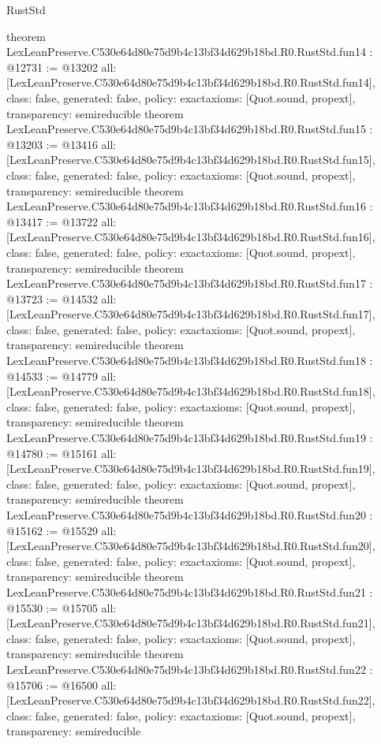 \begin{lexlean}{RustStd}
\begin{coremodule}
{}
theorem LexLeanPreserve.C530e64d80e75d9b4c13bf34d629b18bd.R0.RustStd.fun14 : @12731 := @13202 {
  all: [LexLeanPreserve.C530e64d80e75d9b4c13bf34d629b18bd.R0.RustStd.fun14],
  class: false,
  generated: false,
  policy: exact{axioms: [Quot.sound, propext]},
  transparency: semireducible
}
theorem LexLeanPreserve.C530e64d80e75d9b4c13bf34d629b18bd.R0.RustStd.fun15 : @13203 := @13416 {
  all: [LexLeanPreserve.C530e64d80e75d9b4c13bf34d629b18bd.R0.RustStd.fun15],
  class: false,
  generated: false,
  policy: exact{axioms: [Quot.sound, propext]},
  transparency: semireducible
}
theorem LexLeanPreserve.C530e64d80e75d9b4c13bf34d629b18bd.R0.RustStd.fun16 : @13417 := @13722 {
  all: [LexLeanPreserve.C530e64d80e75d9b4c13bf34d629b18bd.R0.RustStd.fun16],
  class: false,
  generated: false,
  policy: exact{axioms: [Quot.sound, propext]},
  transparency: semireducible
}
theorem LexLeanPreserve.C530e64d80e75d9b4c13bf34d629b18bd.R0.RustStd.fun17 : @13723 := @14532 {
  all: [LexLeanPreserve.C530e64d80e75d9b4c13bf34d629b18bd.R0.RustStd.fun17],
  class: false,
  generated: false,
  policy: exact{axioms: [Quot.sound, propext]},
  transparency: semireducible
}
theorem LexLeanPreserve.C530e64d80e75d9b4c13bf34d629b18bd.R0.RustStd.fun18 : @14533 := @14779 {
  all: [LexLeanPreserve.C530e64d80e75d9b4c13bf34d629b18bd.R0.RustStd.fun18],
  class: false,
  generated: false,
  policy: exact{axioms: [Quot.sound, propext]},
  transparency: semireducible
}
theorem LexLeanPreserve.C530e64d80e75d9b4c13bf34d629b18bd.R0.RustStd.fun19 : @14780 := @15161 {
  all: [LexLeanPreserve.C530e64d80e75d9b4c13bf34d629b18bd.R0.RustStd.fun19],
  class: false,
  generated: false,
  policy: exact{axioms: [Quot.sound, propext]},
  transparency: semireducible
}
theorem LexLeanPreserve.C530e64d80e75d9b4c13bf34d629b18bd.R0.RustStd.fun20 : @15162 := @15529 {
  all: [LexLeanPreserve.C530e64d80e75d9b4c13bf34d629b18bd.R0.RustStd.fun20],
  class: false,
  generated: false,
  policy: exact{axioms: [Quot.sound, propext]},
  transparency: semireducible
}
theorem LexLeanPreserve.C530e64d80e75d9b4c13bf34d629b18bd.R0.RustStd.fun21 : @15530 := @15705 {
  all: [LexLeanPreserve.C530e64d80e75d9b4c13bf34d629b18bd.R0.RustStd.fun21],
  class: false,
  generated: false,
  policy: exact{axioms: [Quot.sound, propext]},
  transparency: semireducible
}
theorem LexLeanPreserve.C530e64d80e75d9b4c13bf34d629b18bd.R0.RustStd.fun22 : @15706 := @16500 {
  all: [LexLeanPreserve.C530e64d80e75d9b4c13bf34d629b18bd.R0.RustStd.fun22],
  class: false,
  generated: false,
  policy: exact{axioms: [Quot.sound, propext]},
  transparency: semireducible
}
\end{coremodule}
\end{lexlean}
